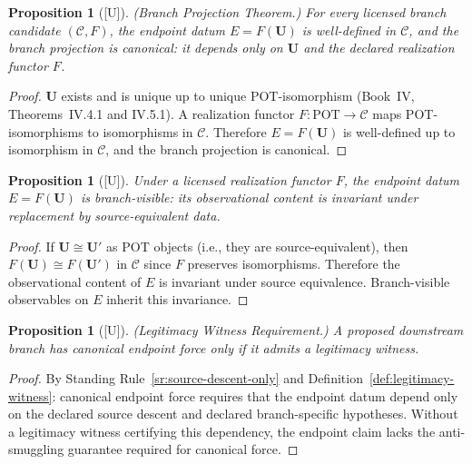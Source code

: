\documentclass[12pt,oneside]{amsbook}
\theoremstyle{plain}
\newtheorem{proposition}[theorem]{Proposition}
\theoremstyle{definition}
\theoremstyle{remark}
\newcommand{\status}[1]{\textup{[#1]}}
\begin{document}
\begin{proposition}[\status{U}]\label{prop:branch-projection}
\textup{(Branch Projection Theorem.)}  For every licensed branch
candidate $(\mathcal{C}, F)$, the endpoint datum $E = F(\mathbf{U})$
is well-defined in $\mathcal{C}$, and the branch projection is
canonical: it depends only on $\mathbf{U}$ and the declared
realization functor $F$.
\end{proposition}

\begin{proof}
$\mathbf{U}$ exists and is unique up to unique POT-isomorphism
(Book~IV, Theorems~IV.4.1 and IV.5.1).  A realization functor
$F: \mathrm{POT} \to \mathcal{C}$ maps POT-isomorphisms to isomorphisms
in $\mathcal{C}$.  Therefore $E = F(\mathbf{U})$ is well-defined up to
isomorphism in $\mathcal{C}$, and the branch projection is canonical.
\end{proof}

\begin{proposition}[\status{U}]\label{prop:endpoint-visibility}
Under a licensed realization functor $F$, the endpoint datum $E =
F(\mathbf{U})$ is branch-visible: its observational content is
invariant under replacement by source-equivalent data.
\end{proposition}

\begin{proof}
If $\mathbf{U} \cong \mathbf{U}'$ as POT objects (i.e., they are
source-equivalent), then $F(\mathbf{U}) \cong F(\mathbf{U}')$ in
$\mathcal{C}$ since $F$ preserves isomorphisms.  Therefore the
observational content of $E$ is invariant under source equivalence.
Branch-visible observables on $E$ inherit this invariance.
\end{proof}

\begin{proposition}[\status{U}]\label{prop:legitimacy-witness-required}
\textup{(Legitimacy Witness Requirement.)}  A proposed downstream
branch has canonical endpoint force only if it admits a legitimacy
witness.
\end{proposition}

\begin{proof}
By Standing Rule~\ref{sr:source-descent-only} and
Definition~\ref{def:legitimacy-witness}: canonical endpoint force
requires that the endpoint datum depend only on the declared source
descent and declared branch-specific hypotheses.  Without a legitimacy
witness certifying this dependency, the endpoint claim lacks the
anti-smuggling guarantee required for canonical force.
\end{proof}
\end{document}

